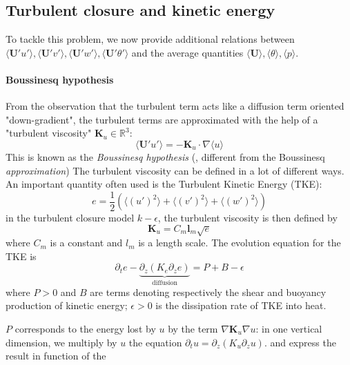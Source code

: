 \subsection{Turbulent closure and kinetic energy}
\label{sec:airseaSCM_turbulentClosure}
To tackle this problem, we now provide additional relations between
$\langle \mathbf{U}' u'\rangle, \langle \mathbf{U}' v'\rangle,\langle \mathbf{U}' w'\rangle,
\langle \mathbf{U}' \theta'\rangle$ and the average quantities
$\langle \mathbf{U}\rangle, \langle \theta \rangle, \langle p \rangle$.
\paragraph{Boussinesq hypothesis}
From the observation that the turbulent term acts like a diffusion
term oriented "down-gradient", the turbulent terms are approximated
with the help of a "turbulent viscosity"
$\mathbf{K}_u \in \mathbb{R}^3$:
\begin{equation}
\langle \mathbf{U}' u'\rangle = - \mathbf{K}_u \cdot \nabla
	\langle u \rangle
\end{equation}
This is known as the \textit{Boussinesq hypothesis}
(\citep{boussinesq_theorie_1897},
different from the Boussinesq \textit{approximation})
The turbulent viscosity can be defined in a lot of different ways.
An important quantity often used is the Turbulent Kinetic Energy (TKE):
\begin{equation}
	e = \frac{1}{2} \left(\langle (u')^2 \rangle + \langle (v')^2 \rangle
	+ \langle (w')^2 \rangle\right)
\end{equation}
in the turbulent closure model $k-\epsilon$,
the turbulent viscosity is then defined by
\begin{equation}
	\mathbf{K}_u = C_m \mathbf{l}_m \sqrt{e}
\end{equation}
where $C_m$ is a constant and $l_m$ is a length scale.
The evolution equation for the TKE
is
\begin{equation}
	\partial_t e - 
\underbrace{\partial_z \left(K_e
    \partial_z e\right)}_{\text{diffusion}}
    = P + B - \epsilon
\end{equation}
where $P>0$ and $B$ are terms denoting respectively
the shear and buoyancy production of kinetic energy;
$\epsilon>0$ is the dissipation rate of TKE
into heat.
\par
$P$ corresponds to the energy lost by $u$ by the
term $\nabla \mathbf{K}_u \nabla u$:
in one vertical dimension, we
multiply by $u$ the equation
$\partial_t u = \partial_z (K_u \partial_z u)$.
and express the result in function of the
